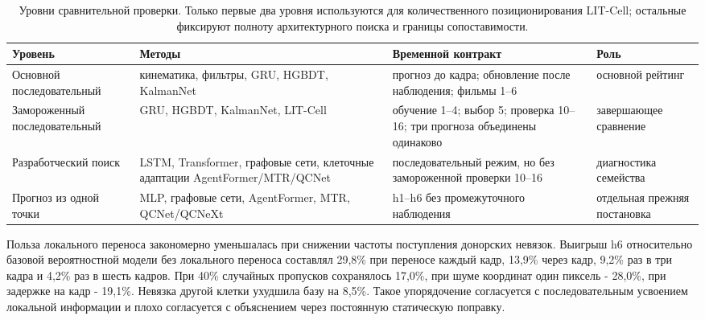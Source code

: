 \documentclass[11pt,a4paper]{article}
\begin{document}
\begin{table}[H]
\centering
\caption{Уровни сравнительной проверки. Только первые два уровня используются для количественного позиционирования LIT-Cell; остальные фиксируют полноту архитектурного поиска и границы сопоставимости.}
\label{tab:comparator_scope}
\small
\setlength{\tabcolsep}{4pt}
\begin{tabularx}{\textwidth}{@{}L{0.22\textwidth} L{0.28\textwidth} Y L{0.18\textwidth}@{}}
\toprule
Уровень & Методы & Временной контракт & Роль \\
\midrule
Основной последовательный & кинематика, фильтры, GRU, HGBDT, KalmanNet & прогноз до кадра; обновление после наблюдения; фильмы 1--6 & основной рейтинг \\
Замороженный последовательный & GRU, HGBDT, KalmanNet, LIT-Cell & обучение 1--4; выбор 5; проверка 10--16; три прогноза объединены одинаково & завершающее сравнение \\
Разработческий поиск & LSTM, Transformer, графовые сети, клеточные адаптации AgentFormer/MTR/QCNet & последовательный режим, но без замороженной проверки 10--16 & диагностика семейства \\
Прогноз из одной точки & MLP, графовые сети, AgentFormer, MTR, QCNet/QCNeXt & h1--h6 без промежуточного наблюдения & отдельная прежняя постановка \\
\bottomrule
\end{tabularx}
\end{table}

Польза локального переноса закономерно уменьшалась при снижении частоты поступления донорских невязок. Выигрыш h6 относительно базовой вероятностной модели без локального переноса составлял 29,8\% при переносе каждый кадр, 13,9\% через кадр, 9,2\% раз в три кадра и 4,2\% раз в шесть кадров. При 40\% случайных пропусков сохранялось 17,0\%, при шуме координат один пиксель - 28,0\%, при задержке на кадр - 19,1\%. Невязка другой клетки ухудшила базу на 8,5\%. Такое упорядочение согласуется с последовательным усвоением локальной информации и плохо согласуется с объяснением через постоянную статическую поправку.
\end{document}
